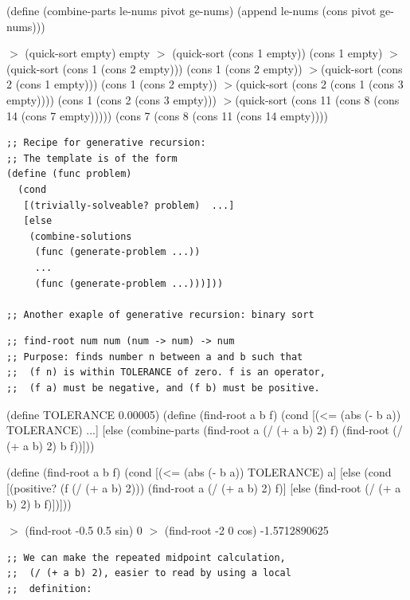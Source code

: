 \documentclass{article}
\begin{document}
\begin{schemedisplay}
(define (combine-parts le-nums pivot ge-nums)
  (append le-nums (cons pivot ge-nums)))
\end{schemedisplay}

\begin{schemedisplay}
$>$ (quick-sort empty) 
empty
$>$ (quick-sort (cons 1 empty))
(cons 1 empty)
$>$(quick-sort (cons 1 (cons 2 empty)))
(cons 1 (cons 2 empty))
$>$(quick-sort (cons 2 (cons 1 empty)))
(cons 1 (cons 2 empty))
$>$(quick-sort (cons 2 (cons 1 (cons 3 empty))))
(cons 1 (cons 2 (cons 3 empty)))
$>$(quick-sort (cons 11 (cons 8 (cons 14 (cons 7 empty)))))
(cons 7 (cons 8 (cons 11 (cons 14 empty))))
\end{schemedisplay}

\newpage

\begin{verbatim}
;; Recipe for generative recursion: 
;; The template is of the form
(define (func problem)
  (cond
   [(trivially-solveable? problem)  ...]
   [else
    (combine-solutions
     (func (generate-problem ...))
     ...
     (func (generate-problem ...)))]))

;; Another exaple of generative recursion: binary sort
\end{verbatim}

\begin{verbatim}
;; find-root num num (num -> num) -> num
;; Purpose: finds number n between a and b such that
;;  (f n) is within TOLERANCE of zero. f is an operator,
;;  (f a) must be negative, and (f b) must be positive.
\end{verbatim}
\begin{schemedisplay}
(define TOLERANCE 0.00005)
(define (find-root a b f)
  (cond
    [(<= (abs (- b a)) TOLERANCE) ...]
    [else
     (combine-parts
      (find-root a (/ (+ a b) 2) f)
      (find-root (/ (+ a b) 2) b f))]))
\end{schemedisplay}

\begin{schemedisplay}
(define (find-root a b f)
  (cond
    [(<= (abs (- b a)) TOLERANCE) a]
    [else
     (cond
      [(positive? (f (/ (+ a b) 2)))
       (find-root a (/ (+ a b) 2) f)]
      [else
       (find-root (/ (+ a b) 2) b f)])]))

$>$ (find-root -0.5 0.5 sin)
0
$>$ (find-root -2 0 cos)
-1.5712890625
\end{schemedisplay}

\newpage

\begin{verbatim}
;; We can make the repeated midpoint calculation,
;;  (/ (+ a b) 2), easier to read by using a local
;;  definition:
\end{verbatim}
\end{document}
